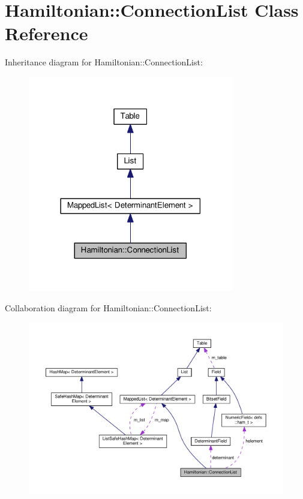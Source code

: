 \hypertarget{classHamiltonian_1_1ConnectionList}{}\section{Hamiltonian\+:\+:Connection\+List Class Reference}
\label{classHamiltonian_1_1ConnectionList}


Inheritance diagram for Hamiltonian\+:\+:Connection\+List\+:\nopagebreak
\begin{figure}[H]
\begin{center}
\leavevmode
\includegraphics[width=254pt]{classHamiltonian_1_1ConnectionList__inherit__graph}
\end{center}
\end{figure}


Collaboration diagram for Hamiltonian\+:\+:Connection\+List\+:\nopagebreak
\begin{figure}[H]
\begin{center}
\leavevmode
\includegraphics[width=350pt]{classHamiltonian_1_1ConnectionList__coll__graph}
\end{center}
\end{figure}

